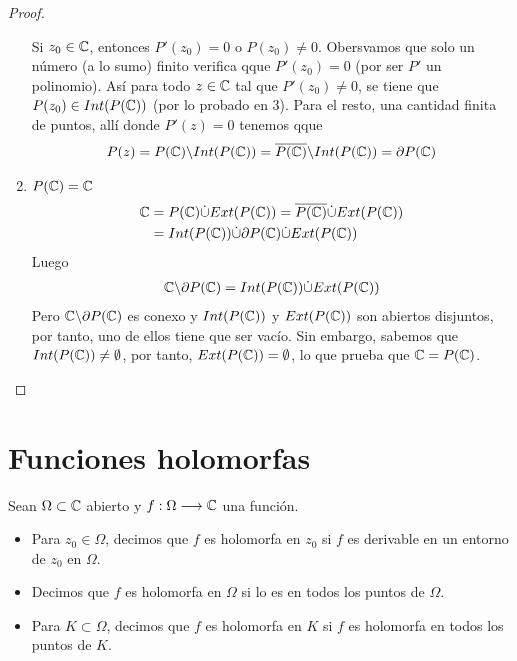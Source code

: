 \begin{proof}
\begin{enumerate}
              Si $z_0 \in \mathbb{C}$, entonces $P'(z_0) = 0$ o $P(z_0) \not = 0$. Obersvamos que solo un número (a lo sumo) finito verifica qque $P'(z_0) = 0$ (por ser $P'$ un polinomio). Así para todo $z \in \mathbb{C}$ tal que $P'(z_0) \not = 0$, se tiene que $P(z_0) \in Int(P(\mathbb{C}))$ (por lo probado en 3). Para el resto, una cantidad finita de puntos, allí donde $P'(z) = 0$ tenemos qque
              \begin{align*}
                  P(z) = P(\mathbb{C}) \backslash Int(P(\mathbb{C})) = \overline{P(\mathbb{C})} \backslash Int(P(\mathbb{C})) = \partial P(\mathbb{C})
              \end{align*}
        \item \underline{$P(\mathbb{C}) = \mathbb{C}$}
              \begin{align*}
                  \mathbb{C} & = P(\mathbb{C}) \dot\cup Ext(P(\mathbb{C})) = \overline{P(\mathbb{C})} \dot\cup Ext(P(\mathbb{C})) \\
                       & = Int(P(\mathbb{C})) \dot\cup \partial P(\mathbb{C}) \dot\cup Ext(P(\mathbb{C}))
              \end{align*}
              Luego
              \begin{align*}
                  \mathbb{C} \backslash \partial P(\mathbb{C}) = Int(P(\mathbb{C})) \dot\cup Ext(P(\mathbb{C}))
              \end{align*}
              Pero $\mathbb{C} \backslash \partial P(\mathbb{C})$ es conexo y $Int(P(\mathbb{C}))$ y $Ext(P(\mathbb{C}))$ son abiertos disjuntos, por tanto, uno de ellos tiene que ser vacío. Sin embargo, sabemos que $Int(P(\mathbb{C})) \not = \emptyset$, por tanto, $Ext(P(\mathbb{C})) = \emptyset$, lo que prueba que $\mathbb{C} = P(\mathbb{C})$.
    \end{enumerate}
\end{proof}

\section{Funciones holomorfas}

\begin{defi}
    Sean $\Omega \subset \mathbb{C}$ abierto y $f: \Omega \longrightarrow \mathbb{C}$ una función.
    \begin{itemize}
        \item Para $z_0 \in \Omega$, decimos que $f$ es holomorfa en $z_0$ si $f$ es derivable en un entorno de $z_0$ en $\Omega$.
        \item Decimos que $f$ es holomorfa en $\Omega$ si lo es en todos los puntos de $\Omega$.
        \item Para $K \subset \Omega$, decimos que $f$ es holomorfa en $K$ si $f$ es holomorfa en todos los puntos de $K$.
    \end{itemize}
\end{defi}

